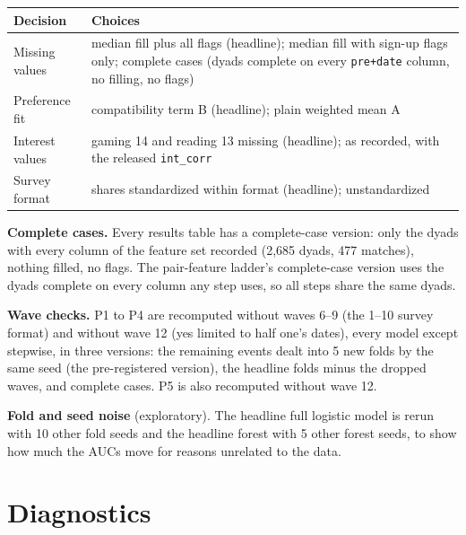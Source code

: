 \documentclass[11pt]{article}
\begin{document}
\small
\begin{center}
\begin{tabular}{L{3.2cm}L{12cm}}
\toprule
\textbf{Decision} & \textbf{Choices} \\
\midrule
Missing values & median fill plus all flags (headline); median fill with sign-up flags only; complete cases (dyads complete on every \texttt{pre+date} column, no filling, no flags) \\
Preference fit & compatibility term B (headline); plain weighted mean A \\
Interest values & gaming 14 and reading 13 missing (headline); as recorded, with the released \texttt{int\_corr} \\
Survey format & shares standardized within format (headline); unstandardized \\
\bottomrule
\end{tabular}
\end{center}
\normalsize

\textbf{Complete cases.} Every results table has a complete-case version: only the dyads with every column of
the feature set recorded (2,685 dyads, 477 matches), nothing filled, no flags. The pair-feature ladder's complete-case
version uses the dyads complete on every column any step uses, so all steps share the same dyads.

\textbf{Wave checks.} P1 to P4 are recomputed without waves 6--9 (the 1--10 survey format) and without wave 12 (yes
limited to half one's dates), every model except stepwise, in three versions: the remaining events dealt into 5 new
folds by the same seed (the pre-registered version), the headline folds minus the dropped waves, and complete cases.
P5 is also recomputed without wave 12.

\textbf{Fold and seed noise} (exploratory). The headline full logistic model is rerun with 10 other fold seeds and the
headline forest with 5 other forest seeds, to show how much the AUCs move for reasons unrelated to the data.

\section{Diagnostics}
\end{document}
